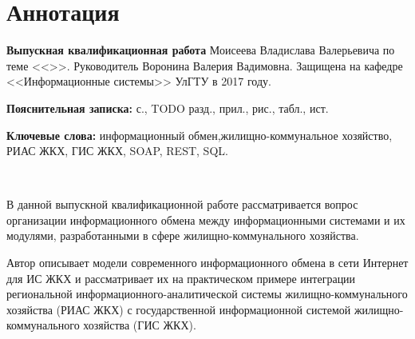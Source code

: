 
\section*{Аннотация}

\textbf{Выпускная квалификационная работа} Моисеева Владислава Валерьевича по теме <<\WorkName>>.
Руководитель Воронина Валерия Вадимовна.
Защищена на кафедре <<Информационные системы>> УлГТУ в 2017 году.

\textbf{Пояснительная записка:}  с.,  TODO разд.,  прил.,  рис.,  табл.,  ист.

\textbf{Ключевые слова:} информационный обмен,\linebreak жилищно-коммунальное хозяйство, РИАС ЖКХ, ГИС ЖКХ, SOAP, REST, SQL.

~

В данной выпускной квалификационной работе рассматривается вопрос организации информационного обмена между информационными системами и их модулями, разработанными в сфере жилищно-коммунального хозяйства.

Автор описывает модели современного информационного обмена в сети Интернет для ИС ЖКХ и рассматривает их на практическом примере интеграции региональной информационного-аналитической системы жилищно-коммунального хозяйства (РИАС ЖКХ) с государственной информационной системой жилищно-коммунального хозяйства (ГИС ЖКХ).

\clearpage
\newpage